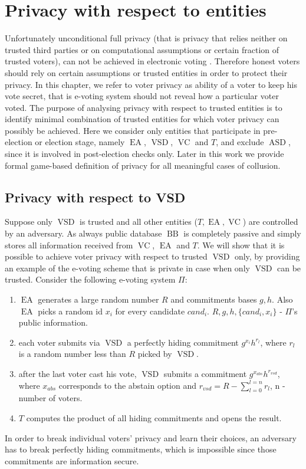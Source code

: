 \documentclass[12pt]{article}
\DeclareMathOperator{\vsd}{VSD}
\DeclareMathOperator{\asd}{ASD}
\DeclareMathOperator{\ea}{EA}
\DeclareMathOperator{\bb}{BB}
\DeclareMathOperator{\voc}{VC}
\begin{document}
%
%
\section{Privacy with respect to entities}
 Unfortunately unconditional full privacy (that is privacy that relies neither on trusted third parties or  on computational assumptions or certain fraction of trusted  voters), can not  be achieved in electronic voting \cite{Brandt2005}. Therefore honest voters should rely on certain assumptions or trusted entities in order to protect their privacy. In this chapter, we refer to voter privacy as ability of a voter to keep his vote secret, that is e-voting system should not reveal how a particular voter voted. The purpose of analysing  privacy with respect to trusted entities is to identify minimal combination of trusted entities for which voter privacy can possibly be achieved. Here we consider only entities that participate in pre-election or election stage, namely $\ea$, $\vsd$, $\voc$ and $T$, and exclude $\asd$, since it is involved in post-election checks only. Later in this work we provide formal game-based definition of privacy for all meaningful cases of collusion.  
\subsection{Privacy with respect to VSD}
Suppose only $\vsd$ is trusted and all other entities ($T,\ea,\voc$) are controlled by an adversary. As always public database $\bb$ is completely passive and simply stores all information received from $\voc$, $\ea$ and $T$. We will show that it is possible to achieve voter privacy with respect to trusted $\vsd$ only, by providing an example of the e-voting scheme that is private in case when only $\vsd$ can be trusted. Consider the following e-voting system $\Pi$:
\begin{enumerate}
 \item $\ea$ generates a large random number $R$ and commitments bases $g,h$. Also $\ea$ picks a random id  $x_i$ for every candidate $cand_i$. $R,g,h, \{cand_i,x_i\}$  - $\Pi$'s public information. 
 \item each voter submits via $\vsd$ a perfectly hiding commitment $g^{x_i}h^{r_l}$, where $r_l$ is a random number less than $R$ picked by $\vsd$. 
 \item after the last voter cast his vote, $\vsd$ submits a commitment $g^{x_{abs}}h^{r_{vsd}}$, where $x_{abs}$ corresponds to the abstain option and $r_{vsd} = R - \sum_{l=0}^{l=n}r_l$, n - number of voters.  
 \item $T$ computes the product of all hiding commitments and opens the result.
 \end{enumerate}
In order to break individual voters' privacy and learn their choices, an adversary has to break perfectly hiding commitments, which is impossible since those commitments are information secure.\\
\end{document}
